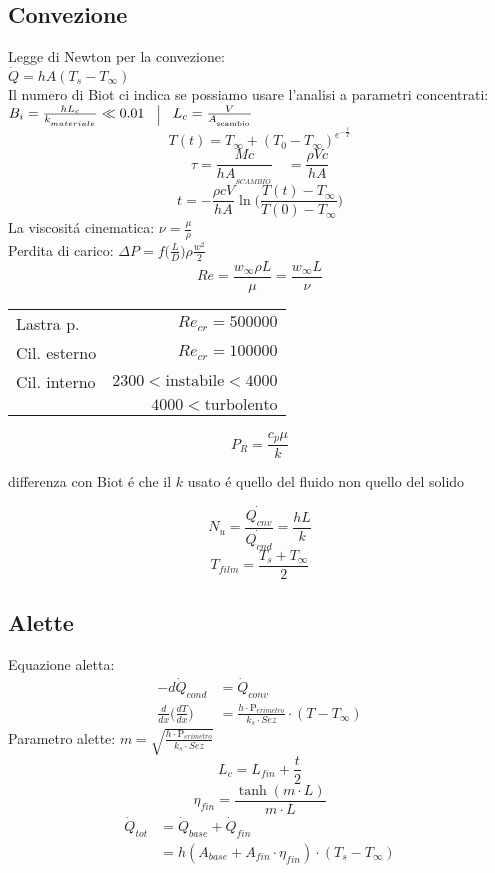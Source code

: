 \documentclass[portrait,a4paper]{article}
\begin{document}
\begin{multicols}{3}
\section*{Convezione}
Legge di Newton per la convezione:\\
\(\dot{Q} = h A (T_s - T_{\infty})\) \\
Il numero di Biot ci indica se possiamo usare l'analisi a parametri concentrati: \\
\( B_{i} = \frac {hL_{c}}{k_{_{materiale}}} \ll 0.01 \quad \vline \quad 
 L_{c} = \frac {V}{A_{_{\text{scambio}}}} \)
\[T(t) = T_{\infty} + {(T_0-T_\infty)}^{e^{- \frac{t}{T}} }\]
\[ \tau = \frac {Mc}{hA_{_{SCAMBIO}}} \quad   = \frac{\rho Vc}{hA} \]
\[t = -  \frac {\rho cV}{hA} \ln \bigg ( \frac {T(t)-T_{\infty}}{T(0)-T_{\infty}}  \bigg )\]
La viscositá cinematica: \(\nu = \frac {\mu}{\rho} \) \\
Perdita di carico: \(\Delta P = f\big(\frac{L}{D}\big)\rho \frac{w^2}{2}\) \\
\[ Re = \frac {w_{\infty} \rho L}{\mu}   = \frac{w_{\infty} L}{\nu} \]
\begin{tabular}{l r}
	Lastra p. & $Re_{cr} = 500000$ \\
	Cil. esterno & $Re_{cr} = 100000$ \\
	Cil. interno & $2300 < \text{instabile} < 4000$ \\
	 & $ 4000 < \text{turbolento}$
\end{tabular}

\[ P_{R} = \frac {c_p\mu}{k} \]
\begin{tiny}differenza con Biot é che il \(k\) usato é quello del fluido non quello del solido\end{tiny}
\[ N_{u} = \frac{\dot{Q_{cnv}}}{\dot{Q_{cnd}}} = \frac {hL}{k} \]
\[T_{film} = \frac{T_s + T_{\infty}}{2}\]

\subsection*{Alette}
Equazione aletta:
\begin{align*}
	-d\dot{Q}_{cond} &= \dot{Q}_{conv} \\
	\frac{d}{dx} \big( \frac{dT}{dx} \big) &= \frac{h\cdot \text{P}_{erimetro}}{k_s\cdot Sez} \cdot (T-T_{\infty})
\end{align*}
Parametro alette: \(m=\sqrt{\frac{h\cdot \text{P}_{erimetro}}{k_s\cdot Sez}}\)
\[L_{c} = L_{fin} + \frac {t}{2} \]
\[\eta_{fin} = \frac{\tanh(m\cdot L)}{m\cdot L}\]
\begin{align*}
\dot{Q}_{tot} &= \dot{Q}_{base} + \dot{Q}_{fin} \\
&= h(A_{base} + A_{fin} \cdot \eta_{fin} ) \cdot (T_s-T_{\infty})
\end{align*}


\end{multicols}
\end{document}
